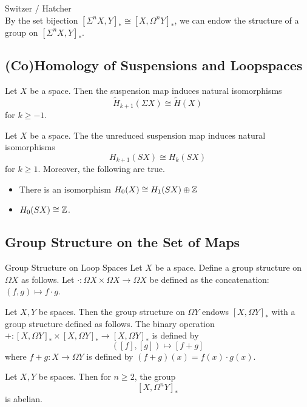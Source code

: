 \documentclass[a4paper]{article}
\begin{document}
Switzer / Hatcher\\

By the set bijection $[\Sigma^nX,Y]_\ast\cong[X,\Omega^nY]_\ast$, we can endow the structure of a group on $[\Sigma^nX,Y]_\ast$. 

\subsection{(Co)Homology of Suspensions and Loopspaces}
\begin{prp}{}{} Let $X$ be a space. Then the suspension map induces natural isomorphisms $$\widetilde{H}_{k+1}(\Sigma X)\cong\widetilde{H}(X)$$ for $k\geq -1$. 
\end{prp}

\begin{prp}{}{} Let $X$ be a space. The the unreduced suspension map induces natural isomorphisms $$H_{k+1}(SX)\cong H_k(SX)$$ for $k\geq 1$. Moreover, the following are true. 
\begin{itemize}
\item There is an isomorphism $H_0(X)\cong H_1(SX)\oplus\mathbb{Z}$
\item $H_0(SX)\cong\mathbb{Z}$. 
\end{itemize}
\end{prp}

\subsection{Group Structure on the Set of Maps}
\begin{defn}{Group Structure on Loop Spaces}{} Let $X$ be a space. Define a group structure on $\Omega X$ as follows. Let $\cdot:\Omega X\times\Omega X\to\Omega X$ be defined as the concatenation: $(f,g)\mapsto f\cdot g$. 
\end{defn}

\begin{prp}{}{} Let $X,Y$ be spaces. Then the group structure on $\Omega Y$ endows $[X,\Omega Y]_\ast$ with a group structure defined as follows. The binary operation $+:[X,\Omega Y]_\ast\times[X,\Omega Y]_\ast\to[X,\Omega Y]_\ast$ is defined by $$([f],[g])\mapsto[f+g]$$ where $f+g:X\to\Omega Y$ is defined by $(f+g)(x)=f(x)\cdot g(x)$. 
\end{prp}

\begin{prp}{}{} Let $X,Y$ be spaces. Then for $n\geq 2$, the group $$[X,\Omega^n Y]_\ast$$ is abelian. 
\end{prp}
\end{document}
